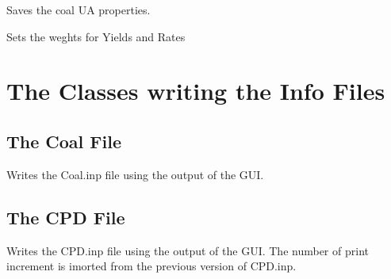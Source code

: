 \documentclass[letterpaper,10pt,english]{sphinxmanual}
\begin{document}
\begin{fulllineitems}
\begin{fulllineitems}
\end{fulllineitems}


\begin{fulllineitems}
\label{GUI:PKPgui.InfosFromGUI.setUA}
Saves the coal UA properties.

\end{fulllineitems}


\begin{fulllineitems}
\label{GUI:PKPgui.InfosFromGUI.setWeightYR}
Sets the weghts for Yields and Rates

\end{fulllineitems}


\end{fulllineitems}



\section{The Classes writing the Info Files}
\label{GUI:the-classes-writing-the-info-files}

\subsection{The Coal File}
\label{GUI:the-coal-file}

\begin{fulllineitems}
\label{GUI:writeInfoFiles.WriteCoalFile}
Writes the Coal.inp file using the output of the GUI.

\end{fulllineitems}



\subsection{The CPD File}
\label{GUI:the-cpd-file}

\begin{fulllineitems}
\label{GUI:writeInfoFiles.WriteCPDFile}
Writes the CPD.inp file using the output of the GUI. The number of print increment is imorted from the previous version of CPD.inp.

\end{fulllineitems}
\end{document}
